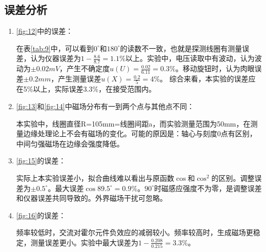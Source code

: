 \documentclass[11pt]{article}
\begin{document}
\subsection{误差分析}
\begin{enumerate}
    \item \cref{fig:12}中的误差：
    \par \hspace*{2em}在表\ref{tab:9}中，可以看到$0^\circ$和$180^\circ$的读数不一致，也就是探测线圈有测量误差，认为仪器误差为$1-\frac{8.6}{8.7}=1.1\%$以上。实验中，电压读取中有波动，认为波动为$\pm 0.02mV$，产生不确定度$u(U)=\frac{0.02}{6.11}=0.3\%$。移动旋钮时，认为肉眼误差$\pm 0.2mm$，产生测量误差$u(X)=\frac{0.2}{5}=4\%$。
          综合来看，本实验的误差应在5\%以上，实际误差3.3\%，在接受范围内。
    \item \cref{fig:13}和\cref{fig:14}中磁场分布有一到两个点与其他点不同：
    \par \hspace*{2em}本实验中，线圈直径R=105mm=线圈间距a，而实验测量范围为50mm，在测量边缘处理论上不会有磁场的变化。可能的原因是：轴心与刻度0点有区别，中间匀强磁场在边缘会强度降低。
    \item \cref{fig:15}的误差：
    \par \hspace*{2em}实际上本实验误差小，拟合曲线难以看出与原函数$\cos$和$\cos^2$的区别。调整误差为$\pm0.5^\circ$。最大误差$\cos89.5^\circ=0.9\%$。$90^\circ$时磁感应强度不为零，是调整误差和仪器误差共同导致的。外界磁场干扰可忽略。
    \item \cref{fig:16}的误差：
    \par \hspace*{2em}频率较低时，交流对霍尔元件负效应的减弱较小。频率较高时，生成磁场更稳定，测量误差更小。实验中最大误差为$1-\frac{0.208}{0.215}=3.3\%$。
\end{enumerate}
\end{document}
